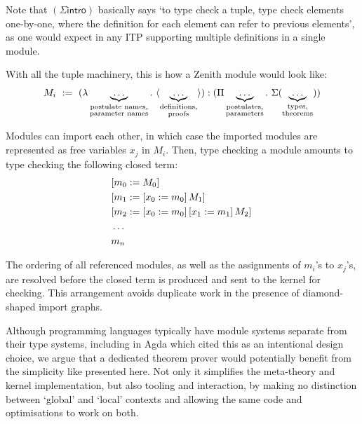 \documentclass[twoside]{report}
\begin{document}
Note that $(\Sigma\mathsf{intro})$ basically says `to type check a tuple, type check elements one-by-one, where the definition for each element can refer to previous elements', as one would expect in any ITP supporting multiple definitions in a single module.

With all the tuple machinery, this is how a Zenith module would look like: $$M_i\ \defeq\ (\lambda \underbrace{\ldots}_{\substack{\text{postulate names,}\\\text{parameter names}}}.\ \langle \underbrace{\ldots}_{\substack{\text{definitions,}\\\text{proofs}}} \rangle) : (\Pi \underbrace{\ldots}_{\substack{\text{postulates,}\\\text{parameters}}}.\ \Sigma(\underbrace{\ldots}_{\substack{\text{types,}\\\text{theorems}}}))$$

Modules can import each other, in which case the imported modules are represented as free variables $x_j$ in $M_i$. Then, type checking a module amounts to type checking the following closed term: $$
    \begin{aligned}
         & [{m_0}:={M_0}]\,{}                                         \\
         & [{m_1}:={[{x_0}:={m_0}]\,{M_1}}]\,{}                     \\
         & [{m_2}:={[{x_0}:={m_0}]\,{[{x_1}:={m_1}]\,{M_2}}}]\,{} \\
         & \ldots                                                       \\
         & m_n
    \end{aligned}
$$

The ordering of all referenced modules, as well as the assignments of $m_i$'s to $x_j$'s, are resolved before the closed term is produced and sent to the kernel for checking. This arrangement avoids duplicate work in the presence of diamond-shaped import graphs.

Although programming languages typically have module systems separate from their type systems, including in Agda \cite{norell2007towards} which cited this as an intentional design choice, we argue that a dedicated theorem prover would potentially benefit from the simplicity like presented here. Not only it simplifies the meta-theory and kernel implementation, but also tooling and interaction, by making no distinction between `global' and `local' contexts and allowing the same code and optimisations to work on both.
\end{document}
